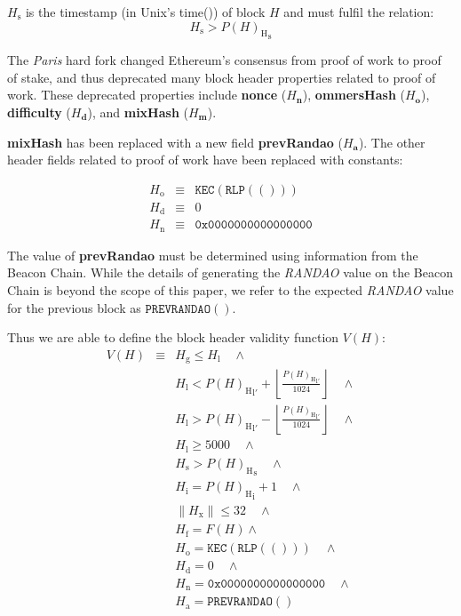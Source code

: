 \documentclass[9pt,oneside]{amsart}
\begin{document}
\begin{multicols}{2}
\hypertarget{block_timestamp_H__s}{}$H_{\mathrm{s}}$ is the timestamp (in Unix's time()) of block $H$ and must fulfil the relation:
\begin{equation}
H_{\mathrm{s}} > {P(H)_{\mathrm{H}}}_{\mathrm{s}}
\end{equation}

The \textit{Paris} hard fork changed Ethereum's consensus from proof of work to proof of stake, and thus deprecated many block header properties related to proof of work. These deprecated properties include \textbf{nonce} ($H_{\mathbf{n}}$), \textbf{ommersHash} ($H_{\mathbf{o}}$), \textbf{difficulty} ($H_{\mathbf{d}}$), and \textbf{mixHash} ($H_{\mathbf{m}}$).

\textbf{mixHash} has been replaced with a new field \textbf{prevRandao} ($H_{\mathbf{a}}$). The other header fields related to proof of work have been replaced with constants:

\begin{eqnarray}
  H_{\mathrm{o}} & \equiv & \texttt{KEC}(\texttt{RLP}(())) \\
  H_{\mathrm{d}} & \equiv  & 0 \\
  H_{\mathrm{n}}  & \equiv & \texttt{0x0000000000000000}
\end{eqnarray}

The value of \textbf{prevRandao} must be determined using information from the Beacon Chain.
While the details of generating the \textit{RANDAO} value on the Beacon Chain is beyond the scope of this paper, we refer to the expected \textit{RANDAO} value for the previous block as $\mathtt{PREVRANDAO}()$.

\hypertarget{block_header_validity_function}{}Thus we are able to define the block header validity function $V(H)$:
\begin{eqnarray}
V(H) & \equiv & H_{\mathrm{g}} \le H_{\mathrm{l}}  \quad \wedge \\
\nonumber& & H_{\mathrm{l}} < {P(H)_{\mathrm{H}}}_{\mathrm{l}'} + \left\lfloor\frac{{P(H)_{\mathrm{H}}}_{\mathrm{l}'}}{1024}\right\rfloor  \quad \wedge \\
\nonumber& & H_{\mathrm{l}} > {P(H)_{\mathrm{H}}}_{\mathrm{l}'} - \left\lfloor\frac{{P(H)_{\mathrm{H}}}_{\mathrm{l}'}}{1024}\right\rfloor  \quad \wedge \\
\nonumber& & H_{\mathrm{l}} \geqslant 5000  \quad \wedge \\
\nonumber& & H_{\mathrm{s}} > {P(H)_{\mathrm{H}}}_{\mathrm{s}} \quad \wedge \\
\nonumber& & H_{\mathrm{i}} = {P(H)_{\mathrm{H}}}_{\mathrm{i}} +1 \quad \wedge \\
\nonumber& & \lVert H_{\mathrm{x}} \rVert \le 32 \quad \wedge \\
\nonumber& & H_{\mathrm{f}} = F(H) \wedge \\
\nonumber& & H_{\mathrm{o}} = \texttt{KEC}(\texttt{RLP}(())) \quad \wedge \\
\nonumber& & H_{\mathrm{d}} = 0 \quad \wedge \\
\nonumber& & H_{\mathrm{n}} = \texttt{0x0000000000000000} \quad \wedge \\
\nonumber& & H_{\mathrm{a}} = \mathtt{PREVRANDAO}()
\end{eqnarray}


\end{multicols}
\end{document}
